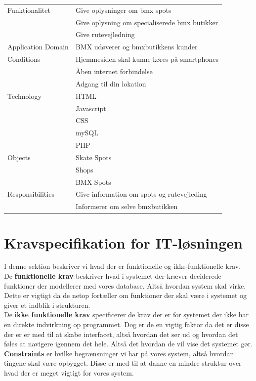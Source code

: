 \documentclass[12pt]{article}
\begin{document}
\begin{raggedleft}
  \begin{tabular}{| l | l |}
    \hline
    Funktionalitet & Give oplysninger om bmx spots\\ & Give oplysning om specialiserede bmx butikker\\ & Give rutevejledning\\ \hline
    Application Domain & BMX udøverer og bmxbutikkens kunder\\ \hline
    Conditions & Hjemmesiden skal kunne køres på smartphones\\ & Åben internet forbindelse \\ & Adgang til din lokation\\
    \hline
        Technology & HTML \\ & Javascript \\ & CSS\\ & mySQL\\ & PHP\\
    \hline
        Objects & Skate Spots\\ & Shops\\ & BMX Spots\\
    \hline
        Responsibilities & Give information om spots og rutevejleding \\ & Informerer om selve bmxbutikken\\
    \hline
  \end{tabular}
\end{raggedleft}


\pagebreak

\section{Kravspecifikation for IT-løsningen}
I denne sektion beskriver vi hvad der er funktionelle og ikke-funktionelle krav.\\
De \textbf{funktionelle krav }beskriver hvad i systemet der kræver deciderede funktioner der modellerer med vores database. Altså hvordan system skal virke. Dette er vigtigt da de netop fortæller om funktioner der skal være i systemet og giver et indblik i strukturen.\\
De \textbf{ikke funktionelle krav} specificerer de krav der er for systemet der ikke har en direkte indvirkning op programmet. Dog er de en vigtig faktor da det er disse der er er med til at skabe interfacet, altså hvordan det ser ud og hvordan det føles at navigere igennem det hele. Altså det hvordan de vil vise det systemet gør.\\ 
\textbf{Constraints} er hvilke begrænsninger vi har på vores system, altså hvordan tingene skal være opbygget. Disse er med til at danne en mindre struktur over hvad der er meget vigtigt for vores system.
\end{document}
